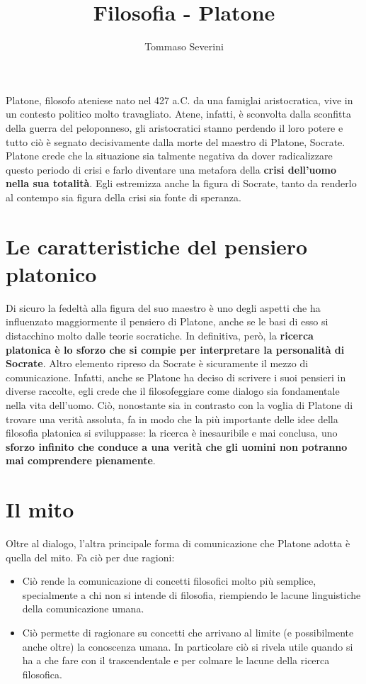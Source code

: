 \documentclass[10pt,a4paper]{article}
\author{Tommaso Severini}
\title{Filosofia - Platone}
\begin{document}
	\maketitle

  Platone, filosofo ateniese nato nel 427 a.C. da una famiglai aristocratica, vive in un contesto politico molto travagliato. Atene, infatti, è sconvolta dalla sconfitta della guerra del peloponneso, gli aristocratici stanno perdendo il loro potere e tutto ciò è segnato decisivamente dalla morte del maestro di Platone, Socrate. Platone crede che la situazione sia talmente negativa da dover radicalizzare questo periodo di crisi e farlo diventare una metafora della \textbf{crisi dell'uomo nella sua totalità}. Egli estremizza anche la figura di Socrate, tanto da renderlo al contempo sia figura della crisi sia fonte di speranza.

  \section{Le caratteristiche del pensiero platonico}

   Di sicuro la fedeltà alla figura del suo maestro è uno degli aspetti che ha influenzato maggiormente il pensiero di Platone, anche se le basi di esso si distacchino molto dalle teorie socratiche. In definitiva, però, la \textbf{ricerca platonica è lo sforzo che si compie per interpretare la personalità di Socrate}. Altro elemento ripreso da Socrate è sicuramente il mezzo di comunicazione. Infatti, anche se Platone ha deciso di scrivere i suoi pensieri in diverse raccolte, egli crede che il filosofeggiare come dialogo sia fondamentale nella vita dell'uomo. Ciò, nonostante sia in contrasto con la voglia di Platone di trovare una verità assoluta, fa in modo che la più importante delle idee della filosofia platonica si sviluppasse: la ricerca è inesauribile e mai conclusa, uno \textbf{sforzo infinito che conduce a una verità che gli uomini non potranno mai comprendere pienamente}.

   \section{Il mito}

   Oltre al dialogo, l'altra principale forma di comunicazione che Platone adotta è quella del mito. Fa ciò per due ragioni:
   \begin{itemize}
     \item Ciò rende la comunicazione di concetti filosofici molto più semplice, specialmente a chi non si intende di filosofia, riempiendo le lacune linguistiche della comunicazione umana.
     \item Ciò permette di ragionare su concetti che arrivano al limite (e possibilmente anche oltre) la conoscenza umana. In particolare ciò si rivela utile quando si ha a che fare con il trascendentale e per colmare le lacune della ricerca filosofica.
   \end{itemize}
\end{document}
